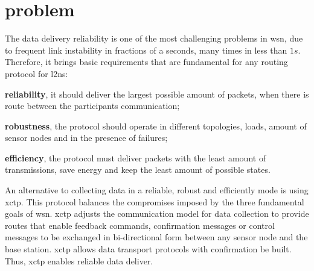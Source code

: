 \section{problem}
\label{sec:problem}


The data delivery reliability is one of the most challenging
problems in \ac{wsn}, due to frequent link instability in fractions
of a seconds, many times in less than $1s$\cite{betaFactor}.
Therefore, it brings basic requirements that are fundamental for any
routing protocol for \ac{l2ns}:
\begin{inparaenum}
    \item \textbf{reliability}, it should deliver the largest possible amount of packets, when there is route between the participants communication;
    \item \textbf{robustness}, the protocol should operate in different topologies, loads, amount of sensor nodes and in the presence of failures;
    \item \textbf{efficiency}, the protocol must deliver packets with the least amount of transmissions, save energy and keep the least amount of possible states.
\end{inparaenum}


An alternative to collecting data in a reliable, robust and
efficiently mode is using \ac{xctp}. This protocol balances the
compromises imposed by the three fundamental goals of \ac{wsn}.
\ac{xctp} adjusts the communication model for data collection to
provide routes that enable feedback commands, confirmation messages
 or control messages to be exchanged in bi-directional form between
any sensor node and the base station. \ac{xctp} allows data
transport protocols with confirmation be built. Thus, \ac{xctp}
enables reliable data deliver.
